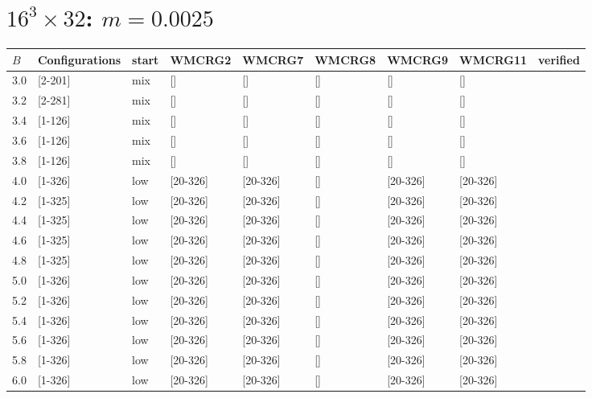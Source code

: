 \documentclass[11pt]{article}
\begin{document}
  \section{$16^3\times32$:  $m=0.0025$}
    \begin{tabular}{| l | l | l | l | l | l | l | l | l |}
      \hline
      $B$ & Configurations & start & WMCRG2 & WMCRG7 & WMCRG8 & WMCRG9 & WMCRG11 & verified\\
      \hline
      3.0 & [2-201] & mix & [] & [] & [] & [] & [] &\\
      3.2 & [2-281] & mix & [] & [] & [] & [] & [] &\\
      3.4 & [1-126] & mix & [] & [] & [] & [] & [] &\\
      3.6 & [1-126] & mix & [] & [] & [] & [] & [] &\\
      3.8 & [1-126] & mix & [] & [] & [] & [] & [] &\\
      4.0 & [1-326] & low & [20-326] & [20-326] & [] & [20-326] & [20-326] &\\
      4.2 & [1-325] & low & [20-326] & [20-326] & [] & [20-326] & [20-326] &\\
      4.4 & [1-325] & low & [20-326] & [20-326] & [] & [20-326] & [20-326] &\\
      4.6 & [1-325] & low & [20-326] & [20-326] & [] & [20-326] & [20-326] &\\
      4.8 & [1-325] & low & [20-326] & [20-326] & [] & [20-326] & [20-326] &\\
      5.0 & [1-326] & low & [20-326] & [20-326] & [] & [20-326] & [20-326] &\\
      5.2 & [1-326] & low & [20-326] & [20-326] & [] & [20-326] & [20-326] &\\
      5.4 & [1-326] & low & [20-326] & [20-326] & [] & [20-326] & [20-326] &\\
      5.6 & [1-326] & low & [20-326] & [20-326] & [] & [20-326] & [20-326] &\\
      5.8 & [1-326] & low & [20-326] & [20-326] & [] & [20-326] & [20-326] &\\
      6.0 & [1-326] & low & [20-326] & [20-326] & [] & [20-326] & [20-326] &\\
      \hline
    \end{tabular}
\end{document}
